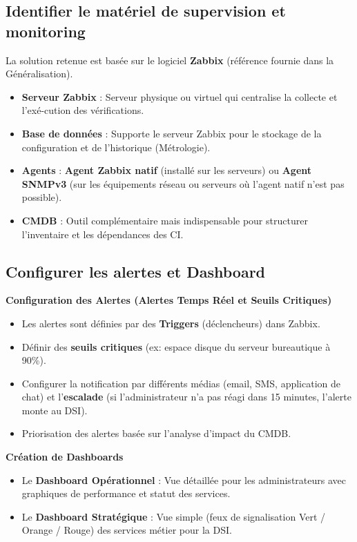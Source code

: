 \subsection*{Identifier le matériel de supervision et monitoring}
{}

\noindent La solution retenue est basée sur le logiciel \textbf{Zabbix} (référence fournie dans la Généralisation).
\begin{itemize}
    \item \textbf{Serveur Zabbix} : Serveur physique ou virtuel qui centralise la collecte et l'exé-cution des vérifications.
    \item \textbf{Base de données} : Supporte le serveur Zabbix pour le stockage de la configuration et de l'historique (Métrologie).
    \item \textbf{Agents} : \textbf{Agent Zabbix natif} (installé sur les serveurs) ou \textbf{Agent SNMPv3} (sur les équipements réseau ou serveurs où l'agent natif n'est pas possible).
    \item \textbf{CMDB} : Outil complémentaire mais indispensable pour structurer l'inventaire et les dépendances des CI.
\end{itemize}

\newpage

\subsection*{Configurer les alertes et Dashboard}
{}

\noindent \textbf{Configuration des Alertes (Alertes Temps Réel et Seuils Critiques)}
\begin{itemize}
    \item Les alertes sont définies par des \textbf{Triggers} (déclencheurs) dans Zabbix.
    \item Définir des \textbf{seuils critiques} (ex: espace disque du serveur bureautique à 90\%).
    \item Configurer la notification par différents médias (email, SMS, application de chat) et l'\textbf{escalade} (si l'administrateur n'a pas réagi dans 15 minutes, l'alerte monte au DSI).
    \item Priorisation des alertes basée sur l'analyse d'impact du CMDB.
\end{itemize}
\vspace{0.5em}
\noindent \textbf{Création de Dashboards}
\begin{itemize}
    \item Le \textbf{Dashboard Opérationnel} : Vue détaillée pour les administrateurs avec graphiques de performance et statut des services.
    \item Le \textbf{Dashboard Stratégique} : Vue simple (feux de signalisation Vert / Orange / Rouge) des services métier pour la DSI.
\end{itemize}

